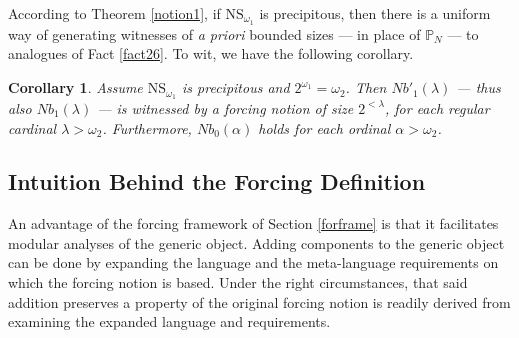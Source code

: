 \documentclass[12pt, twoside]{memoir}
\numberwithin{equation}{section}
\newtheorem{cor}[thm]{Corollary}
\theoremstyle{definition}
\theoremstyle{remark}
\theoremstyle{definition}
\theoremstyle{definition}
\theoremstyle{definition}
\theoremstyle{remark}
\begin{document}
According to Theorem \ref{notion1}, if $\mathrm{NS}_{\omega_1}$ is precipitous, then there is a uniform way of generating witnesses of \textit{a priori} bounded sizes --- in place of $\mathbb{P}_N$ --- to analogues of Fact \ref{fact26}. To wit, we have the following corollary.

\begin{cor}\label{nambacoro}
Assume $\mathrm{NS}_{\omega_1}$ is precipitous and $2^{\omega_1} = \omega_2$. Then $Nb'_1(\lambda)$ --- thus also $Nb_1(\lambda)$ --- is witnessed by a forcing notion of size $2^{< \lambda}$, for each regular cardinal $\lambda > \omega_2$. Furthermore, $Nb_0(\alpha)$ holds for each ordinal $\alpha > \omega_2$.
\end{cor}

\subsection{Intuition Behind the Forcing Definition}\label{intuit}

An advantage of the forcing framework of Section \ref{forframe} is that it facilitates modular analyses of the generic object. Adding components to the generic object can be done by expanding the language and the meta-language requirements on which the forcing notion is based. Under the right circumstances, that said addition preserves a property of the original forcing notion is readily derived from examining the expanded language and requirements.
\end{document}
